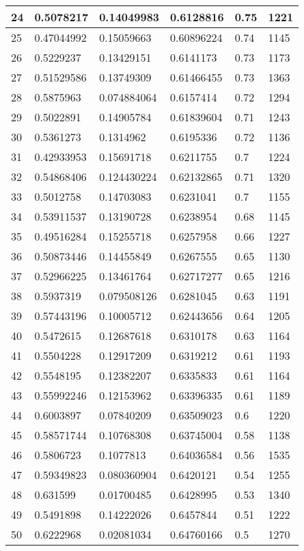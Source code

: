 \begin{longtable}{|l|l|l|l|l|l|}
24 & 0.5078217 & 0.14049983 & 0.6128816 & 0.75 & 1221 \\ \hline 
25 & 0.47044992 & 0.15059663 & 0.60896224 & 0.74 & 1145 \\ \hline 
26 & 0.5229237 & 0.13429151 & 0.6141173 & 0.73 & 1173 \\ \hline 
27 & 0.51529586 & 0.13749309 & 0.61466455 & 0.73 & 1363 \\ \hline 
28 & 0.5875963 & 0.074884064 & 0.6157414 & 0.72 & 1294 \\ \hline 
29 & 0.5022891 & 0.14905784 & 0.61839604 & 0.71 & 1243 \\ \hline 
30 & 0.5361273 & 0.1314962 & 0.6195336 & 0.72 & 1136 \\ \hline 
31 & 0.42933953 & 0.15691718 & 0.6211755 & 0.7 & 1224 \\ \hline 
32 & 0.54868406 & 0.124430224 & 0.62132865 & 0.71 & 1320 \\ \hline 
33 & 0.5012758 & 0.14703083 & 0.6231041 & 0.7 & 1155 \\ \hline 
34 & 0.53911537 & 0.13190728 & 0.6238954 & 0.68 & 1145 \\ \hline 
35 & 0.49516284 & 0.15255718 & 0.6257958 & 0.66 & 1227 \\ \hline 
36 & 0.50873446 & 0.14455849 & 0.6267555 & 0.65 & 1130 \\ \hline 
37 & 0.52966225 & 0.13461764 & 0.62717277 & 0.65 & 1216 \\ \hline 
38 & 0.5937319 & 0.079508126 & 0.6281045 & 0.63 & 1191 \\ \hline 
39 & 0.57443196 & 0.10005712 & 0.62443656 & 0.64 & 1205 \\ \hline 
40 & 0.5472615 & 0.12687618 & 0.6310178 & 0.63 & 1164 \\ \hline 
41 & 0.5504228 & 0.12917209 & 0.6319212 & 0.61 & 1193 \\ \hline 
42 & 0.5548195 & 0.12382207 & 0.6335833 & 0.61 & 1164 \\ \hline 
43 & 0.55992246 & 0.12153962 & 0.63396335 & 0.61 & 1189 \\ \hline 
44 & 0.6003897 & 0.07840209 & 0.63509023 & 0.6 & 1220 \\ \hline 
45 & 0.58571744 & 0.10768308 & 0.63745004 & 0.58 & 1138 \\ \hline 
46 & 0.5806723 & 0.1077813 & 0.64036584 & 0.56 & 1535 \\ \hline 
47 & 0.59349823 & 0.080360904 & 0.6420121 & 0.54 & 1255 \\ \hline 
48 & 0.631599 & 0.01700485 & 0.6428995 & 0.53 & 1340 \\ \hline 
49 & 0.5491898 & 0.14222026 & 0.6457844 & 0.51 & 1222 \\ \hline 
50 & 0.6222968 & 0.02081034 & 0.64760166 & 0.5 & 1270 \\ \hline 
\end{longtable}